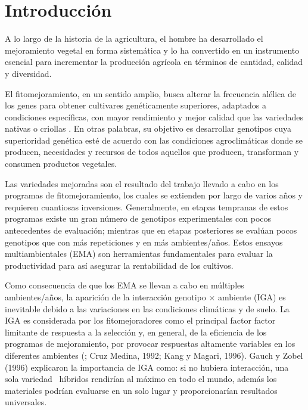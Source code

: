 

\chapter{Introducción}

A lo largo de la historia de la agricultura, el hombre ha desarrollado el mejoramiento vegetal en forma sistemática y lo ha convertido en un instrumento esencial para incrementar la producción agrícola en términos de cantidad, calidad y diversidad.  

El fitomejoramiento, en un sentido amplio, busca alterar la frecuencia alélica de los genes para obtener cultivares  genéticamente superiores, adaptados a condiciones específicas, con mayor rendimiento y mejor calidad que las variedades nativas o criollas \citep{Allard67}. En otras palabras, su objetivo es desarrollar genotipos cuya superioridad genética esté de acuerdo con las condiciones agroclimáticas donde se producen, necesidades y recursos de todos aquellos que producen, transforman y consumen productos vegetales. 

Las variedades mejoradas son el resultado del trabajo llevado a cabo en los programas de fitomejoramiento, los cuales se extienden por largo de varios años y requieren cuantiosas inversiones. Generalmente, en etapas tempranas de estos programas existe un gran número de genotipos experimentales con pocos antecedentes de evaluación; mientras que en etapas posteriores  se evalúan pocos genotipos que con más repeticiones y en más ambientes/años. Estos ensayos multiambientales (EMA) son herramientas fundamentales para evaluar la productividad para así asegurar la rentabilidad de los cultivos.

Como consecuencia de que los EMA se llevan a cabo en múltiples ambientes/años, la aparición de la interacción genotipo $\times$ ambiente (IGA) es inevitable debido a las variaciones en las condiciones climáticas y de suelo. La IGA es considerada por los fitomejoradores como el principal factor factor limitante de  respuesta a la selección y, en general, de la eficiencia de los programas de mejoramiento, por provocar respuestas altamente variables en los diferentes ambientes (\citet{Crossaetal1990}; Cruz Medina, 1992; Kang y Magari, 1996). Gauch y Zobel (1996) explicaron la importancia de IGA como: si no hubiera interacción, una sola variedad \ híbridos rendirían al máximo en todo el mundo, además los materiales podrían evaluarse en un solo lugar y proporcionarían resultados universales.


